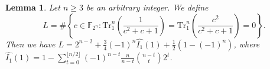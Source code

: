 \documentclass[runningheads,a4paper]{article}
\newtheorem{lemma}{Lemma}
\newcommand{\F}{\mathbb{F}}
\newcommand{\0}{\textbf{0}}
\newcommand{\1}{\textbf{1}}
\renewcommand{\Tr}{\mathrm{Tr}_1^n}
\begin{document}



\begin{lemma}\label{L:SumInv00}
Let $n\geq 3$ be an arbitrary integer. We define
$$L=\#\left\{c\in\F_{2^n} : \mathrm{Tr}_1^n\left(\frac{1}{c^2+c+1}\right)=\mathrm{Tr}_1^n\left(\frac{c^2}{c^2+c+1}\right)=0\right\}.$$
Then we have $L=2^{n-2}+\frac{3}{4}(-1)^n\widehat{I_1}(1)+\frac{1}{2}\left(1-(-1)^n\right)$, where $ \widehat{I_1}(1)=1-\sum_{t=0}^{\lfloor n/2\rfloor}(-1)^{n-t}\frac{n}{n-t}{{n-t}\choose {t}}2^t $.
\end{lemma}
\end{document}
